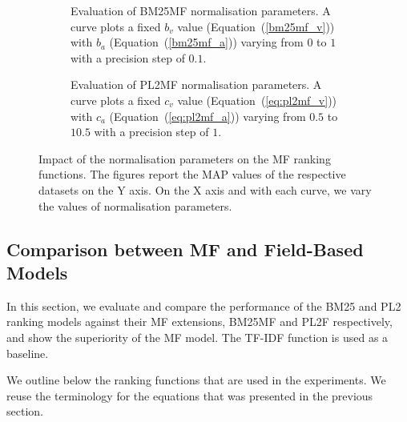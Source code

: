 \begin{figure}
	\centering
	\begin{subfigure}{\textwidth}
		\centering
		
		\addtocounter{subfigure}{-1}
		\caption{Evaluation of BM25MF normalisation parameters. A curve plots a fixed $b_v$ value (Equation~(\ref{bm25mf_v})) with $b_a$ (Equation~(\ref{bm25mf_a})) varying from $0$ to $1$ with a precision step of $0.1$.}
		\label{fig:bm25mf-norm}
	\end{subfigure}
	\qquad
	\begin{subfigure}{\textwidth}
		\centering
		
		\addtocounter{subfigure}{-1}
		\caption{Evaluation of PL2MF normalisation parameters. A curve plots a fixed $c_v$ value (Equation~(\ref{eq:pl2mf_v})) with $c_a$ (Equation~(\ref{eq:pl2mf_a})) varying from $0.5$ to $10.5$ with a precision step of $1$.}
		\label{fig:pl2mf-norm}
	\end{subfigure}
	\caption[Impact of the normalisation parameters on the MF ranking functions]{Impact of the normalisation parameters on the MF ranking functions. The figures report the MAP values of the respective datasets on the Y axis. On the X axis and with each curve, we vary the values of normalisation parameters.}
\end{figure}

\subsection{Comparison between MF and Field-Based Models}
\label{sec:mf-field-cmp}

In this section, we evaluate and compare the performance of the BM25 and PL2 ranking models against their MF extensions, BM25MF and PL2F respectively, and show the superiority of the MF model. The TF-IDF function is used as a baseline.

We outline below the ranking functions that are used in the experiments. We reuse the terminology for the equations that was presented in the previous section.

